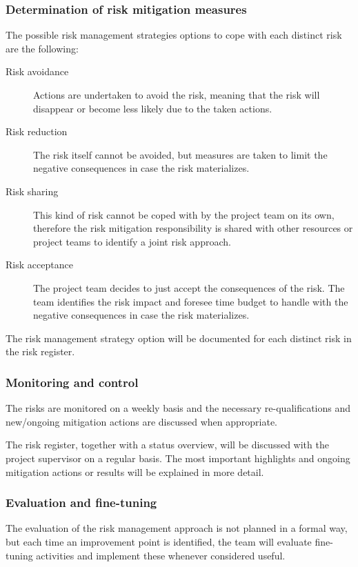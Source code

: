 \subsubsection{Determination of risk mitigation measures}
The possible risk management strategies options to cope with each distinct risk are the following:
\begin{description}
	\item [Risk avoidance]
	Actions are undertaken to avoid the risk, meaning that the risk will disappear or become less likely due to the taken actions.
	\item[Risk reduction]
	The risk itself cannot be avoided, but measures are taken to limit the negative consequences in case the risk materializes.
	\item[Risk sharing]
	This kind of risk cannot be coped with by the project team on its own, therefore the risk mitigation responsibility is shared with other resources or project teams to identify a joint risk approach.
	\item[Risk acceptance]
	The project team decides to just accept the consequences of the risk.
	The team identifies the risk impact and foresee time budget to handle with the negative consequences in case the risk materializes.
\end {description}

\noindent
The risk management strategy option will be documented for each distinct risk in the risk register.

\subsubsection{Monitoring and control}
The risks are monitored on a weekly basis and the necessary re-qualifications and new/ongoing mitigation actions are discussed when appropriate.

The risk register, together with a status overview, will be discussed with the project supervisor on a regular basis.
The most important highlights and ongoing mitigation actions or results will be explained in more detail.

\subsubsection{Evaluation and fine-tuning}
The evaluation of the risk management approach is not planned in a formal way, but each time an improvement point is identified, the team will evaluate fine-tuning activities and implement these whenever considered useful.

